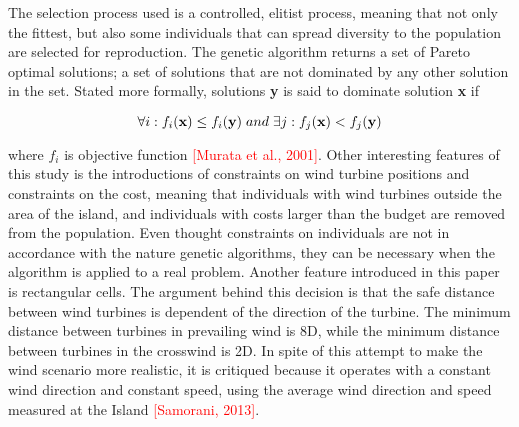 The selection process used is a controlled, elitist process, meaning that not only the fittest, but also some individuals that can spread diversity to the population are selected for reproduction. The genetic algorithm returns a set of Pareto optimal solutions; a set of solutions that are not dominated by any other solution in the set. Stated more formally, solutions \textbf{y} is said to dominate solution \textbf{x} if

\begin{equation}
\forall i: f_i(\textbf{x}) \leq f_i(\textbf{y}) \hspace{1mm} and \hspace{1mm} \exists j: f_j(\textbf{x}) < f_j(\textbf{y}) 
\label{Dominated solutions}
\end{equation}

where $f_i$ is objective function \textcolor{red}{[Murata et al., 2001]}. Other interesting features of this study is the introductions of constraints on wind turbine positions and constraints on the cost, meaning that individuals with wind turbines outside the area of the island, and individuals with costs larger than the budget are removed from the population. Even thought constraints on individuals are not in accordance with the nature genetic algorithms, they can be necessary when the algorithm is applied to a real problem. Another feature introduced in this paper is rectangular cells. The argument behind this decision is that the safe distance between wind turbines is dependent of the direction of the turbine. The minimum distance between turbines in prevailing wind is 8D, while the minimum distance between turbines in the crosswind is 2D. In spite of this attempt to make the wind scenario more realistic, it is critiqued because it operates with a constant wind direction and constant speed, using the average wind direction and speed measured at the Island \textcolor{red}{[Samorani, 2013]}. \\